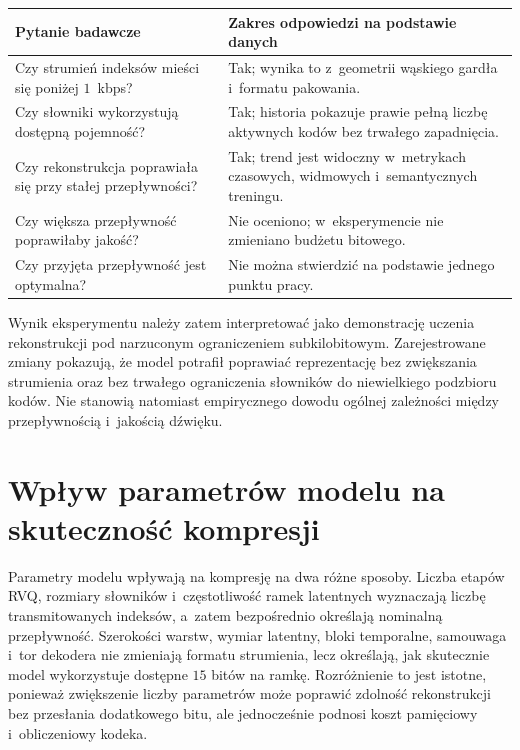 \begin{center}
\centering
\small
\begin{tabular}{>{\raggedright\arraybackslash}p{} >{\raggedright\arraybackslash}p{}}
\toprule
Pytanie badawcze & Zakres odpowiedzi na podstawie danych \\
\midrule
Czy strumień indeksów mieści się poniżej \(1\)~kbps? & Tak; wynika to z~geometrii wąskiego gardła i~formatu pakowania. \\
Czy słowniki wykorzystują dostępną pojemność? & Tak; historia pokazuje prawie pełną liczbę aktywnych kodów bez trwałego zapadnięcia. \\
Czy rekonstrukcja poprawiała się przy stałej przepływności? & Tak; trend jest widoczny w~metrykach czasowych, widmowych i~semantycznych treningu. \\
Czy większa przepływność poprawiłaby jakość? & Nie oceniono; w~eksperymencie nie zmieniano budżetu bitowego. \\
Czy przyjęta przepływność jest optymalna? & Nie można stwierdzić na podstawie jednego punktu pracy. \\
\bottomrule
\end{tabular}
\label{tab:zakres-wnioskow-przeplywnosc}
\end{center}

Wynik eksperymentu należy zatem interpretować jako demonstrację uczenia rekonstrukcji pod narzuconym ograniczeniem subkilobitowym. Zarejestrowane zmiany pokazują, że model potrafił poprawiać reprezentację bez zwiększania strumienia oraz bez trwałego ograniczenia słowników do niewielkiego podzbioru kodów. Nie stanowią natomiast empirycznego dowodu ogólnej zależności między przepływnością i~jakością dźwięku.

\clearpage
\section{Wpływ parametrów modelu na skuteczność kompresji}
\label{sec:wplyw-parametrow-modelu}

Parametry modelu wpływają na kompresję na dwa różne sposoby. Liczba etapów RVQ, rozmiary słowników i~częstotliwość ramek latentnych wyznaczają liczbę transmitowanych indeksów, a~zatem bezpośrednio określają nominalną przepływność. Szerokości warstw, wymiar latentny, bloki temporalne, samouwaga i~tor dekodera nie zmieniają formatu strumienia, lecz określają, jak skutecznie model wykorzystuje dostępne \(15\) bitów na ramkę. Rozróżnienie to jest istotne, ponieważ zwiększenie liczby parametrów może poprawić zdolność rekonstrukcji bez przesłania dodatkowego bitu, ale jednocześnie podnosi koszt pamięciowy i~obliczeniowy kodeka.

